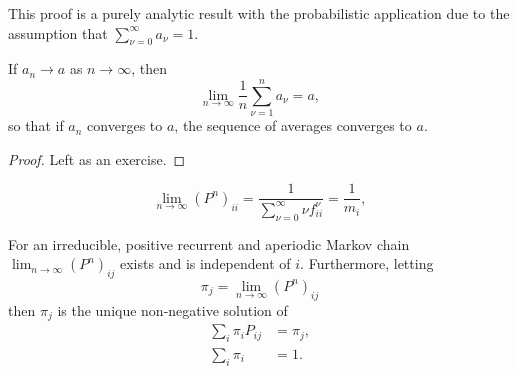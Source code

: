 \documentclass[12pt]{article}
\begin{document}
\begin{enumerate}
\begin{remark}
    This proof is a purely analytic result with the probabilistic
    application due to the assumption that \( \sum_{\nu=0}^{\infty} a_\nu
    = 1 \).
\end{remark}

\begin{lemma}
    If \( a_n \to a \) as \( n \to \infty \), then
    \[
        \lim_{n \to \infty} \frac{1}{n} \sum\limits_{\nu=1}^{n} a_{\nu}
        = a,
    \] so that if \( a_n \) converges to \( a \), the sequence of
    averages converges to \( a \).
\end{lemma}

\begin{proof}
    Left as an exercise.
\end{proof}

\begin{corollary}
    \[
        \lim_{n \to \infty} (P^{n})_{ii} = \frac{1}{\sum\limits_{\nu=0}^
        {\infty} \nu f^{\nu}_{ii}} = \frac{1}{m_i},
    \]
\end{corollary}

\begin{theorem}
    For an irreducible, positive recurrent and aperiodic Markov chain \(
    \lim_{n \to \infty} (P^n)_{ij} \) exists and is independent of \( i \).
    Furthermore, letting
    \[
        \pi_j = \lim_{n \to \infty} (P^n)_{ij}
    \] then \( \pi_j \) is the unique non-negative solution of
    \begin{align}
        \sum\limits_{i} \pi_{i} P_{ij} &= \pi_{j},%
        \label{eq:stationarydistributions:FTMC1}\\
        \sum\limits_{i} \pi_{i} &= 1.%
        \label{eq:stationarydistributions:FTMC2}
    \end{align}
\end{theorem}


\end{enumerate}
\end{document}
